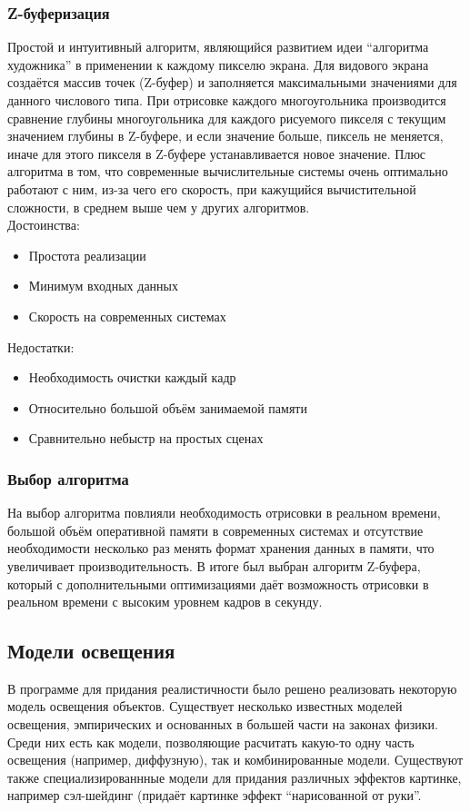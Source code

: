 \documentclass[a4paper,12pt]{report}
\numberwithin{equation}{section}
\begin{document}
\subsubsection*{Z-буферизация}
Простой и интуитивный алгоритм, являющийся развитием идеи ``алгоритма художника'' в применении к каждому пикселю экрана. Для видового экрана создаётся массив точек (Z-буфер) и заполняется максимальными значениями для данного числового типа. При отрисовке каждого многоугольника производится сравнение глубины многоугольника для каждого рисуемого пикселя с текущим значением глубины в Z-буфере, и если значение больше, пиксель не меняется, иначе для этого пикселя в Z-буфере устанавливается новое значение. Плюс алгоритма в том, что современные вычислительные системы очень оптимально работают с ним, из-за чего его скорость, при кажущийся вычистительной сложности, в среднем выше чем у других алгоритмов. \cite{richard2005opengl} \\
Достоинства:
\begin{itemize}
\item Простота реализации
\item Минимум входных данных
\item Скорость на современных системах
\end{itemize}
Недостатки:
\begin{itemize}
\item Необходимость очистки каждый кадр
\item Относительно большой объём занимаемой памяти
\item Сравнительно небыстр на простых сценах
\end{itemize}

\subsubsection*{Выбор алгоритма}
На выбор алгоритма повлияли необходимость отрисовки в реальном времени, большой объём оперативной памяти в современных системах и отсутствие необходимости несколько раз менять формат хранения данных в памяти, что увеличивает производительность. В итоге был выбран алгоритм Z-буфера, который с дополнительными оптимизациями даёт возможность отрисовки в реальном времени с высоким уровнем кадров в секунду.

\subsection{Модели освещения} \label{lighting_reasoning_section}
В программе для придания реалистичности было решено реализовать некоторую модель освещения объектов. Существует несколько известных моделей освещения, эмпирических и основанных в большей части на законах физики. Среди них есть как модели, позволяющие расчитать какую-то одну часть освещения (например, диффузную), так и комбинированные модели. Существуют также специализированнные модели для придания различных эффектов картинке, например сэл-шейдинг (придаёт картинке эффект ``нарисованной от руки''.
\end{document}
